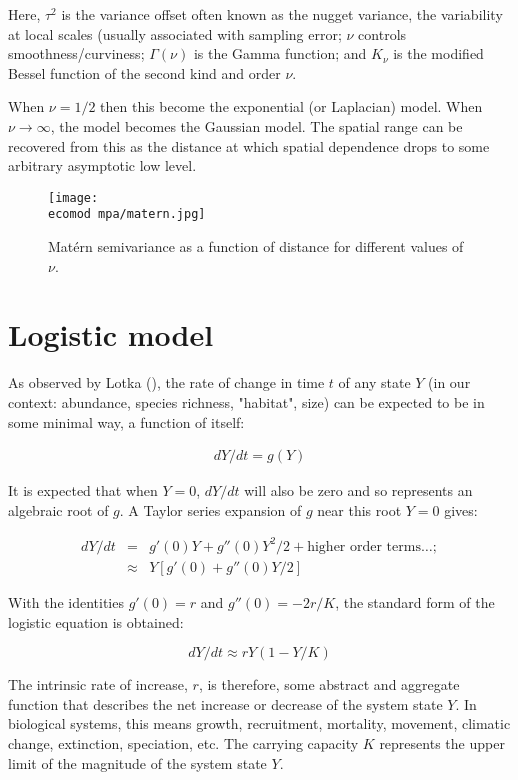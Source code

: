 \documentclass[letterpaper,portrait,11pt]{scrartcl}
\numberwithin{equation}{section}		%
\numberwithin{figure}{section}		%
\numberwithin{table}{section}				%
\newcommand{\ecomod}{\string~/ecomod_data/}   %
\begin{document}
\begin{appendices}
Here, $\tau^2$ is the variance offset often known as the nugget variance, the variability at local scales (usually associated with sampling error; $\nu$ controls smoothness/curviness; $\Gamma(\nu)$ is the Gamma function; and $K_{\nu}$ is the modified Bessel function of the second kind and order $\nu$. 

When $\nu=1/2$ then this become the exponential (or Laplacian) model. When $\nu \longrightarrow \infty$, the model becomes the Gaussian model. The spatial range can be recovered from this as the distance at which spatial dependence drops to some arbitrary asymptotic low level. 

\begin{figure}
  \centering
  \texttt{[image: \\ecomod mpa/matern.jpg]}
  \caption{Mat\'{e}rn semivariance as a function of distance for different values of $\nu$.}
  \label{fig:matern}
\end{figure}


\section{Logistic model}
\label{sec:logisticModel}
As observed by Lotka (\citeyear{lotka1925}), the rate of change in time $t$ of any state $Y$ (in our context: abundance, species richness, "habitat", size) can be expected to be in some minimal way, a function of itself:  

\begin{eqnarray} 
\label{eqLogisticContinuous}
dY / dt = g(Y)
\end{eqnarray}

It is expected that when $Y = 0$, $dY/dt$ will also be zero and so represents an algebraic root of $g$. A Taylor series expansion of $g$ near this root $Y=0$ gives:

\begin{eqnarray*} 
  \label{eqLogisticTaylorSeries}
  dY / dt &=&  g'(0) Y + g''(0) Y^{2}/2  + \text{higher order terms} \dots; \\
  &\approx& Y [g'(0) + g''(0) Y/2  ]
\end{eqnarray*}


With the identities $g'(0) = r$  and $g''(0) = - 2r/K$, the standard form of the logistic equation is obtained:

\begin{equation} 
\label{eqLogistic}
dY/dt \approx r Y (1 - Y/K)
\end{equation}

The intrinsic rate of increase, $r$, is therefore, some abstract and aggregate function that describes the net increase or decrease of the system state $Y$. In biological systems, this means growth, recruitment, mortality, movement, climatic change, extinction, speciation, etc. The carrying capacity $K$ represents the upper limit of the magnitude of the system state $Y$.


\end{appendices}
\end{document}
